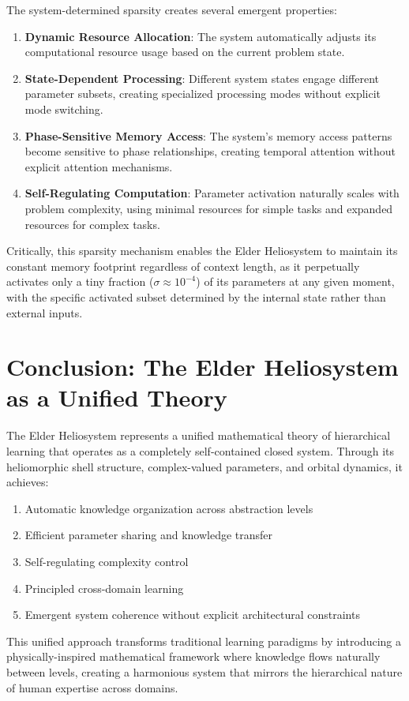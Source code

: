 The system-determined sparsity creates several emergent properties:

\begin{enumerate}
    \item \textbf{Dynamic Resource Allocation}: The system automatically adjusts its computational resource usage based on the current problem state.
    
    \item \textbf{State-Dependent Processing}: Different system states engage different parameter subsets, creating specialized processing modes without explicit mode switching.
    
    \item \textbf{Phase-Sensitive Memory Access}: The system's memory access patterns become sensitive to phase relationships, creating temporal attention without explicit attention mechanisms.
    
    \item \textbf{Self-Regulating Computation}: Parameter activation naturally scales with problem complexity, using minimal resources for simple tasks and expanded resources for complex tasks.
\end{enumerate}

Critically, this sparsity mechanism enables the Elder Heliosystem to maintain its constant memory footprint regardless of context length, as it perpetually activates only a tiny fraction ($\sigma \approx 10^{-4}$) of its parameters at any given moment, with the specific activated subset determined by the internal state rather than external inputs.

\section{Conclusion: The Elder Heliosystem as a Unified Theory}

The Elder Heliosystem represents a unified mathematical theory of hierarchical learning that operates as a completely self-contained closed system. Through its heliomorphic shell structure, complex-valued parameters, and orbital dynamics, it achieves:

\begin{enumerate}
    \item Automatic knowledge organization across abstraction levels
    \item Efficient parameter sharing and knowledge transfer
    \item Self-regulating complexity control
    \item Principled cross-domain learning
    \item Emergent system coherence without explicit architectural constraints
\end{enumerate}

This unified approach transforms traditional learning paradigms by introducing a physically-inspired mathematical framework where knowledge flows naturally between levels, creating a harmonious system that mirrors the hierarchical nature of human expertise across domains.